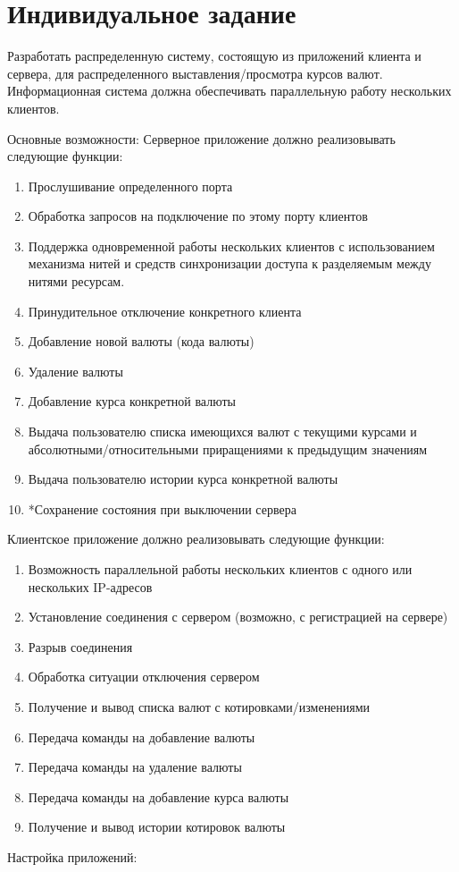 \documentclass[a4paper,14pt]{article}
\begin{document}
\section{Индивидуальное задание}
Разработать распределенную систему, состоящую из приложений клиента и сервера, для распределенного выставления/просмотра курсов валют. Информационная система должна обеспечивать параллельную работу нескольких клиентов.

Основные возможности:
Серверное приложение должно реализовывать следующие функции:
\begin{enumerate}
	
\item Прослушивание определенного порта
\item Обработка запросов на подключение по этому порту клиентов
\item Поддержка одновременной работы нескольких клиентов с использованием механизма нитей и средств синхронизации доступа к разделяемым между нитями ресурсам.
\item Принудительное отключение конкретного клиента
\item Добавление новой валюты (кода валюты)
\item Удаление валюты
\item Добавление курса конкретной валюты
\item Выдача пользователю списка имеющихся валют с текущими курсами и абсолютными/относительными приращениями к предыдущим значениям
\item Выдача пользователю истории курса конкретной валюты
\item *Сохранение состояния при выключении сервера
\end{enumerate}
Клиентское приложение должно реализовывать следующие функции:
	\begin{enumerate}
\item Возможность параллельной работы нескольких клиентов с одного или нескольких IP-адресов
\item Установление соединения с сервером (возможно, с регистрацией на сервере)
\item Разрыв соединения
\item Обработка ситуации отключения сервером
\item Получение и вывод списка валют с котировками/изменениями
\item Передача команды на добавление валюты
\item Передача команды на удаление валюты
\item Передача команды на добавление курса валюты
\item Получение и вывод истории котировок валюты
\end{enumerate}
Настройка приложений:
\end{document}
